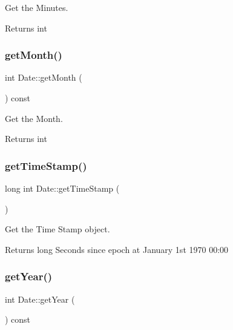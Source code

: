 Get the Minutes. 

\begin{DoxyReturn}{Returns}
int 
\end{DoxyReturn}
\mbox{\label{classDate_a332f6e3a2f6a40d73742b6dab7be0f64}} 
\subsubsection{\texorpdfstring{get\+Month()}{getMonth()}}
{\footnotesize\ttfamily int Date\+::get\+Month (\begin{DoxyParamCaption}{ }\end{DoxyParamCaption}) const}



Get the Month. 

\begin{DoxyReturn}{Returns}
int 
\end{DoxyReturn}
\mbox{\label{classDate_af047ef9ca2cf7843b921f36e9883f0a7}} 
\subsubsection{\texorpdfstring{get\+Time\+Stamp()}{getTimeStamp()}}
{\footnotesize\ttfamily long int Date\+::get\+Time\+Stamp (\begin{DoxyParamCaption}{ }\end{DoxyParamCaption})}



Get the Time Stamp object. 

\begin{DoxyReturn}{Returns}
long Seconds since epoch at January 1st 1970 00\+:00 
\end{DoxyReturn}
\mbox{\label{classDate_a8b0869f34c2b38d108ab83ee2e770e5d}} 
\subsubsection{\texorpdfstring{get\+Year()}{getYear()}}
{\footnotesize\ttfamily int Date\+::get\+Year (\begin{DoxyParamCaption}{ }\end{DoxyParamCaption}) const}



